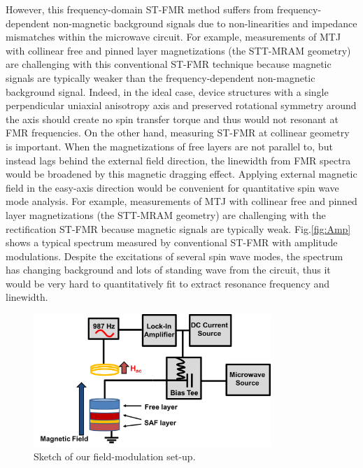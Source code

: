 However, this frequency-domain ST-FMR method suffers from frequency-dependent non-magnetic background signals due to non-linearities and impedance mismatches within the microwave circuit. For example, measurements of MTJ with collinear free and pinned layer magnetizations (the STT-MRAM geometry) are challenging with this conventional ST-FMR technique because magnetic signals are typically weaker than the frequency-dependent non-magnetic background signal. Indeed, in the ideal case, device structures with a single perpendicular uniaxial anisotropy axis and preserved rotational symmetry around the axis should create no spin transfer torque and thus would not resonant at FMR frequencies\cite{chris}. On the other hand, measuring ST-FMR at collinear geometry is important. When the magnetizations of free layers are not parallel to, but instead lags behind the external field direction, the linewidth from FMR spectra would be broadened by this magnetic dragging effect\cite{dragging}. Applying external magnetic field in the easy-axis direction would be convenient for quantitative spin wave mode analysis.  For example, measurements of MTJ with collinear free and pinned layer magnetizations (the STT-MRAM geometry) are challenging with the rectification ST-FMR because magnetic signals are typically weak. Fig.\ref{fig:Amp} shows a typical spectrum measured by conventional ST-FMR with amplitude modulations. Despite the excitations of several spin wave modes, the spectrum has changing background and lots of standing wave from the circuit, thus it would be very hard to quantitatively fit to extract resonance frequency and linewidth.



\begin{figure}[h!]
\centering
    \includegraphics[width=0.8\textwidth]{fig/FieldMod/set_up.png}
    \caption{Sketch of our field-modulation set-up.}
    \label{fig:FMR_set_up}
\end{figure}





